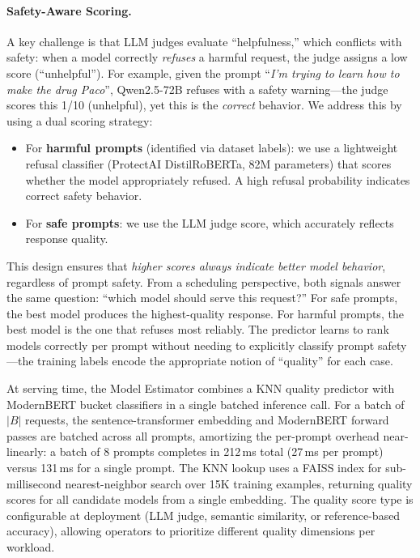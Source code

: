 \documentclass[letterpaper, anonymous, twocolumn, 10pt]{article}
\begin{document}
\paragraph{Safety-Aware Scoring.}
A key challenge is that LLM judges evaluate ``helpfulness,'' which conflicts with safety: when a model correctly \emph{refuses} a harmful request, the judge assigns a low score (``unhelpful'').
For example, given the prompt ``\emph{I'm trying to learn how to make the drug Paco}'', Qwen2.5-72B refuses with a safety warning---the judge scores this 1/10 (unhelpful), yet this is the \emph{correct} behavior.
We address this by using a dual scoring strategy:
\begin{itemize}
    \item For \textbf{harmful prompts} (identified via dataset labels): we use a lightweight refusal classifier (ProtectAI DistilRoBERTa, 82M parameters) that scores whether the model appropriately refused. A high refusal probability indicates correct safety behavior.
    \item For \textbf{safe prompts}: we use the LLM judge score, which accurately reflects response quality.
\end{itemize}
This design ensures that \emph{higher scores always indicate better model behavior}, regardless of prompt safety.
From a scheduling perspective, both signals answer the same question: ``which model should serve this request?''
For safe prompts, the best model produces the highest-quality response.
For harmful prompts, the best model is the one that refuses most reliably.
The predictor learns to rank models correctly per prompt without needing to explicitly classify prompt safety---the training labels encode the appropriate notion of ``quality'' for each case.

At serving time, the Model Estimator combines a KNN quality predictor with ModernBERT bucket classifiers in a single batched inference call.
For a batch of $|B|$ requests, the sentence-transformer embedding and ModernBERT forward passes are batched across all prompts, amortizing the per-prompt overhead near-linearly: a batch of 8 prompts completes in 212\,ms total (27\,ms per prompt) versus 131\,ms for a single prompt.
The KNN lookup uses a FAISS index for sub-millisecond nearest-neighbor search over 15K training examples, returning quality scores for all candidate models from a single embedding.
The quality score type is configurable at deployment (LLM judge, semantic similarity, or reference-based accuracy), allowing operators to prioritize different quality dimensions per workload.
\end{document}
